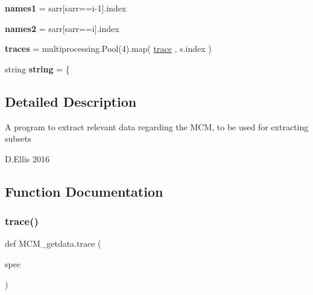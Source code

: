 \begin{DoxyCompactItemize}
\mbox{\label{namespaceMCM__getdata_abd4e2a9cc45f63b8d7a03f20bcb68674}} 
{\bfseries names1} = sarr\mbox{[}sarr==i-\/1\mbox{]}.index
\item 
\mbox{\label{namespaceMCM__getdata_a4429166d60605ecfb3fa20ec8c0629be}} 
{\bfseries names2} = sarr\mbox{[}sarr==i\mbox{]}.index
\item 
\mbox{\label{namespaceMCM__getdata_aac3c4c8ef9bd8a6b6e5b248f4e788e79}} 
{\bfseries traces} = multiprocessing.\+Pool(4).map( \mbox{\hyperlink{namespaceMCM__getdata_af01612e4dc4d42140d736222480555fe}{trace}} , s.\+index )
\item 
\mbox{\label{namespaceMCM__getdata_a6e7c3b11f0a88c4844788c25c14d3836}} 
string {\bfseries string} = \textquotesingle{}\{\textquotesingle{}
\end{DoxyCompactItemize}


\subsection{Detailed Description}
\begin{DoxyVerb}A program to extract relevant data regarding the MCM, 
to be used for extracting subsets

D.Ellis 2016
\end{DoxyVerb}
 

\subsection{Function Documentation}
\mbox{\label{namespaceMCM__getdata_af01612e4dc4d42140d736222480555fe}} 
\subsubsection{\texorpdfstring{trace()}{trace()}}
{\footnotesize\ttfamily def M\+C\+M\+\_\+getdata.\+trace (\begin{DoxyParamCaption}\item[{}]{spec }\end{DoxyParamCaption})}



